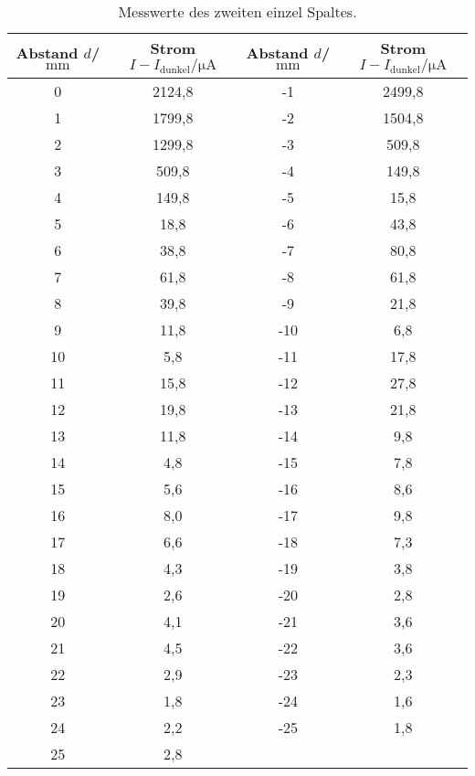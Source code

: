 \begin{table}
  \centering
  \caption{Messwerte des zweiten einzel Spaltes.}
  \label{tab:spalt2}
  \begin{tabular}{c c c c}
Abstand $d$/$\si{\milli\meter}$ & Strom $I-I_\mathrm{dunkel}/\si{\micro\ampere}$&Abstand $d$/$\si{\milli\meter}$ & Strom $I-I_\mathrm{dunkel}/\si{\micro\ampere}$\\
  \midrule
  0  & 2124,8 & -1  & 2499,8\\
  1  & 1799,8 & -2  & 1504,8\\
  2  & 1299,8 & -3  & 509,8 \\
  3  & 509,8  & -4  & 149,8 \\
  4  & 149,8  & -5  & 15,8  \\
  5  &  18,8  & -6  & 43,8  \\
  6  & 38,8   & -7  & 80,8  \\
  7  & 61,8   & -8  & 61,8  \\
  8  & 39,8   & -9  & 21,8  \\
  9  & 11,8   & -10 & 6,8   \\
  10 & 5,8    & -11 & 17,8\\
  11 & 15,8   & -12 & 27,8\\
  12 & 19,8   & -13 & 21,8\\
  13 & 11,8   & -14 & 9,8     \\
  14 & 4,8    & -15 & 7,8     \\
  15 & 5,6    & -16 & 8,6     \\
  16 & 8,0    & -17 & 9,8   \\
  17 & 6,6    & -18 & 7,3   \\
  18 & 4,3    & -19 & 3,8   \\
  19 & 2,6    & -20 & 2,8       \\
  20 & 4,1    & -21 & 3,6       \\
  21 & 4,5    & -22 & 3,6       \\
  22 & 2,9    & -23 & 2,3     \\
  23 & 1,8    & -24 & 1,6     \\
  24 & 2,2    & -25 & 1,8 \\
  25 & 2,8    & &\\
  \bottomrule
  \end{tabular}
\end{table}

